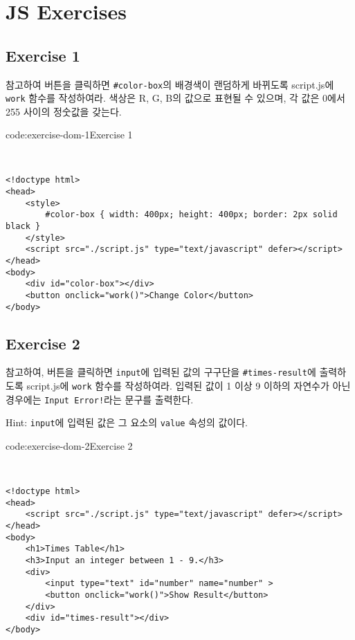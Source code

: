 \section{JS Exercises} \label{sect:js-exercises}

\subsection*{Exercise 1}

\을 참고하여 버튼을 클릭하면 \texttt{\#color-box}의 배경색이 랜덤하게 바뀌도록 script.js에 \texttt{work} 함수를 작성하여라. 색상은 R, G, B의 값으로 표현될 수 있으며, 각 값은 0에서 255 사이의 정숫값을 갖는다.

\begin{codeenv}{code:exercise-dom-1}{Exercise 1}\begin{verbatim}


<!doctype html>
<head>
    <style>
        #color-box { width: 400px; height: 400px; border: 2px solid black }
    </style>
    <script src="./script.js" type="text/javascript" defer></script>
</head>
<body>
    <div id="color-box"></div>
    <button onclick="work()">Change Color</button>
</body>
\end{verbatim}
\end{codeenv}

\subsection*{Exercise 2}

\를 참고하여, 버튼을 클릭하면 \texttt{input}에 입력된 값의 구구단을 \texttt{\#times-result}에 출력하도록 script.js에 \texttt{work} 함수를 작성하여라. 입력된 값이 1 이상 9 이하의 자연수가 아닌 경우에는 \texttt{Input Error!}라는 문구를 출력한다. 

Hint: \texttt{input}에 입력된 값은 그 요소의 \texttt{value} 속성의 값이다.

\begin{codeenv}{code:exercise-dom-2}{Exercise 2}\begin{verbatim}


<!doctype html>
<head>
    <script src="./script.js" type="text/javascript" defer></script>
</head>
<body>
    <h1>Times Table</h1>
    <h3>Input an integer between 1 - 9.</h3>
    <div>
        <input type="text" id="number" name="number" >
        <button onclick="work()">Show Result</button>
    </div>
    <div id="times-result"></div>
</body>
\end{verbatim}
\end{codeenv}

